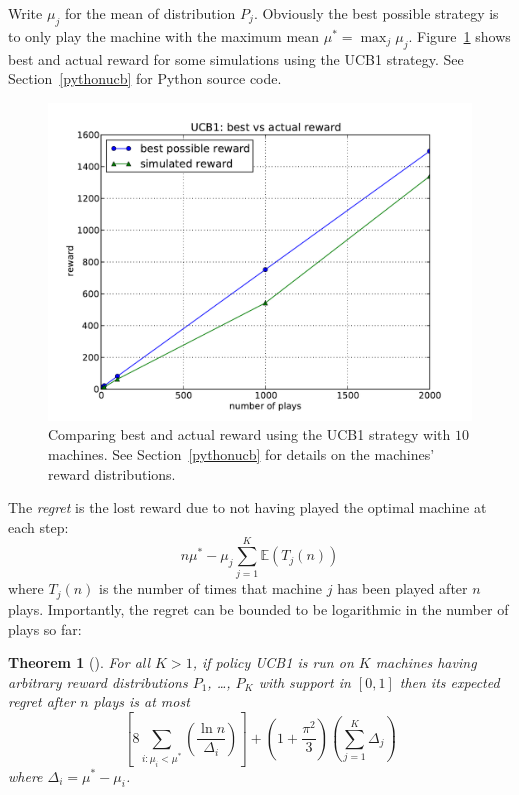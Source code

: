 \documentclass[10pt,amstags,fleqn]{article}
\theoremstyle{plain}
\newtheorem{theorem}{Theorem}[section]
\theoremstyle{definition}
\theoremstyle{definition}
\begin{document}
Write $\mu_j$ for the mean of distribution $P_j$. Obviously the best
possible strategy is to only play the machine with the maximum mean
$\mu^* = \max_j{\mu_j}$. Figure~\ref{figucbreward} shows best and actual
reward for some simulations using the UCB1 strategy.
See Section~\ref{pythonucb} for Python source code.
\begin{figure}[htb]
\begin{center}
\includegraphics[width=.75\textwidth]{best_and_total_reward.pdf}
\end{center}
\caption{Comparing best and actual reward using the UCB1 strategy with
$10$ machines. See Section~\ref{pythonucb} for details on the machines' reward
distributions.}\label{figucbreward}
\end{figure}
The {\em regret} is the lost reward due to not having played the optimal
machine at each step:
\[
n \mu^* - \mu_j \sum_{j=1}^K \mathbb{E}(T_j(n))
\]
where $T_j(n)$ is the number of times that machine $j$ has been played
after $n$ plays. Importantly, the regret can be bounded to be
logarithmic in the number of plays so far:

\begin{theorem}[\cite{Auer:2002}]\label{thmUCB}
For all $K > 1$, if policy \textnormal{UCB1} is run on $K$ machines
having arbitrary reward distributions $P_1$, \dots, $P_K$ with support
in $[0,1]$ then its expected regret after $n$ plays is at most
\[
\left[ 8 \sum_{i:\mu_i < \mu^*} \left( \frac{\ln n}{\Delta_i} \right)  \right] + 
\left( 1 + \frac{\pi^2}{3} \right)
\left( \sum_{j=1}^K \Delta_j \right)
\]
where $\Delta_i = \mu^* - \mu_i$.
\end{theorem}
\end{document}
